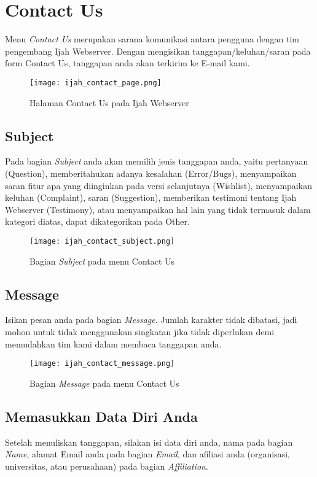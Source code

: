 \section{Contact Us} \label{Contact Us}

Menu \emph{Contact Us} merupakan sarana komunikasi antara pengguna dengan tim pengembang Ijah Webserver. Dengan mengisikan tanggapan/keluhan/saran pada form Contact Us, tanggapan anda akan terkirim ke E-mail kami.

\begin{figure}[H]
	\centering
	\texttt{[image: ijah\_contact\_page.png]}
	\caption{Halaman Contact Us pada Ijah Webserver}
	\label{fig:ijah_contact_page}
\end{figure}

\subsection{Subject}
Pada bagian \emph{Subject} anda akan memilih jenis tanggapan anda, yaitu pertanyaan (Question), memberitahukan adanya kesalahan (Error/Bugs), menyampaikan saran fitur apa yang diinginkan pada versi selanjutnya (Wishlist), menyampaikan keluhan (Complaint), saran (Suggestion), memberikan testimoni tentang Ijah Webserver (Testimony), atau menyampaikan hal lain yang tidak termasuk dalam kategori diatas, dapat dikategorikan pada Other.

\begin{figure}[H]
	\centering
	\texttt{[image: ijah\_contact\_subject.png]}
	\caption{Bagian \emph{Subject} pada menu Contact Us}
	\label{fig:ijah_contact_subject}
\end{figure}

\subsection{Message}
Isikan pesan anda pada bagian \emph{Message}. Jumlah karakter tidak dibatasi, jadi mohon untuk tidak menggunakan singkatan jika tidak diperlukan demi memudahkan tim kami dalam membaca tanggapan anda. 

\begin{figure}[H]
	\centering
	\texttt{[image: ijah\_contact\_message.png]}
	\caption{Bagian \emph{Message} pada menu Contact Us}
	\label{fig:ijah_contact_message}
\end{figure}

\subsection{Memasukkan Data Diri Anda}
Setelah menuliskan tanggapan, silakan isi data diri anda, nama pada bagian \emph{Name}, alamat E\-mail anda pada bagian \emph{E\-mail}, dan afiliasi anda (organisasi, universitas, atau perusahaan) pada bagian \emph{Affiliation}.

